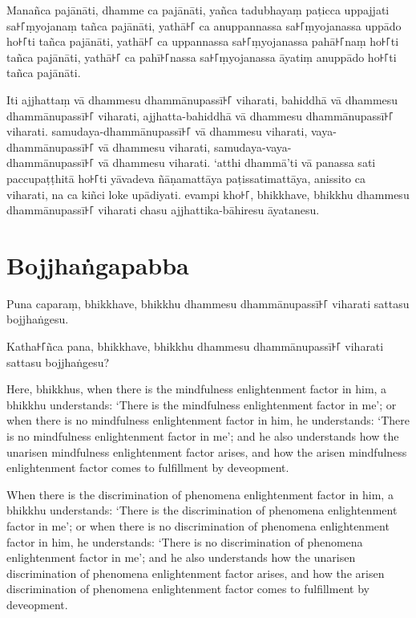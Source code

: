 Manañca pajānāti,
dhamme ca pajānāti,
yañca tadubhayaṃ paṭicca uppajjati sa꜔꜒ṃyojanaṃ tañca pajānāti,
yathā꜔꜒ ca anuppannassa sa꜔꜒ṃyojanassa uppādo ho꜔꜒ti tañca pajānāti,
yathā꜔꜒ ca uppannassa sa꜔꜒ṃyojanassa pahā꜔꜒naṃ ho꜔꜒ti tañca pajānāti,
yathā꜔꜒ ca pahī꜔꜒nassa sa꜔꜒ṃyojanassa āyatiṃ anuppādo ho꜔꜒ti tañca pajānāti.

Iti ajjhattaṃ vā dhammesu dhammānupassī꜔꜒ viharati,
bahiddhā vā dhammesu dhammānupassī꜔꜒ viharati,
ajjhatta-bahiddhā vā dhammesu dhammānupassī꜔꜒ viharati.
samudaya-dhammānupassī꜔꜒ vā dhammesu viharati,
vaya-dhammānupassī꜔꜒ vā dhammesu viharati,
samudaya-vaya-\\ dhammānupassī꜔꜒ vā dhammesu viharati.
‘atthi dhammā’ti vā panassa sati paccupaṭṭhitā ho꜔꜒ti
yāvadeva ñāṇamattāya paṭissatimattāya, anissito ca viharati,
na ca kiñci loke upādiyati. evampi kho꜔꜒, bhikkhave, bhikkhu
dhammesu dhammānupassī꜔꜒ viharati chasu ajjhattika-bāhiresu āyatanesu.


\section*{Bojjhaṅgapabba}

Puna caparaṃ, bhikkhave, bhikkhu dhammesu dhammānupassī꜔꜒ viharati sattasu
bojjhaṅgesu.

Katha꜔꜒ñca pana, bhikkhave, bhikkhu dhammesu dhammānupassī꜔꜒ viharati sattasu
bojjhaṅgesu?

\englishPage

Here, bhikkhus, when there is the mindfulness enlightenment factor in him, a
bhikkhu understands: `There is the mindfulness enlightenment factor in me'; or
when there is no mindfulness enlightenment factor in him, he understands: `There
is no mindfulness enlightenment factor in me'; and he also understands how the
unarisen mindfulness enlightenment factor arises, and how the arisen mindfulness
enlightenment factor comes to fulfillment by deveopment.

When there is the discrimination of phenomena enlightenment factor in him, a
bhikkhu understands: `There is the discrimination of phenomena enlightenment
factor in me'; or when there is no discrimination of phenomena enlightenment
factor in him, he understands: `There is no discrimination of phenomena
enlightenment factor in me'; and he also understands how the unarisen
discrimination of phenomena enlightenment factor arises, and how the arisen
discrimination of phenomena enlightenment factor comes to fulfillment by
deveopment.

